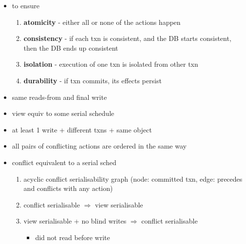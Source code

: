 \documentclass[10pt, landscape]{article}
\begin{document}
\begin{multicols*}{4}
  \begin{itemize}
    \item to ensure 
          \begin{enumerate}
            \item \textbf{atomicity} - either all or none of the actions happen
            \item \textbf{consistency} - if each txn is consistent, and the DB starts consistent, then the DB ends up consistent
            \item \textbf{isolation} - execution of one txn is isolated from other txn
            \item \textbf{durability} - if txn commits, its effects persist
          \end{enumerate}
  \end{itemize}

  \begin{itemize}
    \item {} same reads-from and final write
    \item {} view equiv to some serial schedule
    \item {} at least 1 write + different txns + same object
    \item {} all pairs of conflicting actions are ordered in the same way
  \end{itemize}

  \begin{itemize}
    \item {} conflict equivalent to a serial sched
          \begin{enumerate}
            \item acyclic conflict serialisability graph (node: committed txn, edge: precedes and conflicts with any action)
            \item conflict serialisable $\Rightarrow$ view serialisable
            \item view serialisable + no blind writes $\Rightarrow$ conflict serialisable
                  \begin{itemize}
                    \item {} did not read before write
                  \end{itemize}
          \end{enumerate}
  \end{itemize}


\end{multicols*}
\end{document}
